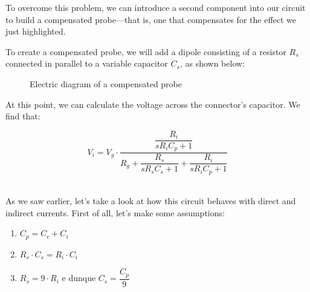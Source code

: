 \documentclass[../main.tex]{subfiles}
\begin{document}
To overcome this problem, we can introduce a second component into our circuit to build a compensated probe—that is, one that compensates for the effect we just highlighted.

To create a compensated probe, we will add a dipole consisting of a resistor $R_s$ connected in parallel to a variable capacitor $C_s$, as shown below:

\begin{figure}[h!]
\begin{center}

	
\end{center}	
\caption{Electric diagram of a compensated probe}
\label{comprobe}
\end{figure}



\newpage
At this point, we can calculate the voltage across the connector's capacitor. We find that:

\[ V_i = V_g \cdot \frac{\dfrac{R_i}{sR_iC_p + 1}}{R_g + \dfrac{R_s}{sR_sC_s + 1} + \dfrac{R_i}{sR_iC_p + 1}}\]\

As we saw earlier, let’s take a look at how this circuit behaves with direct and indirect currents. First of all, let’s make some assumptions:

\begin{enumerate}
	\item[\textbf{-}] $C_p = C_c + C_i $
	\item[\textbf{-}] $R_s \cdot C_s = R_i \cdot C_i $
	\item[\textbf{-}] $R_s = 9 \cdot R_i$ e dunque $C_s = \dfrac{C_p}{9}$	
	
\end{enumerate}
\end{document}
